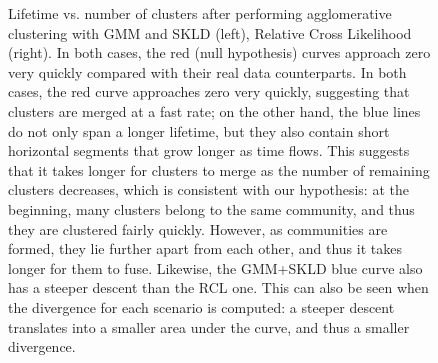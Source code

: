 \documentclass[pdftex,11pt,a4paper]{article}
\theoremstyle{definition}
\theoremstyle{remark}
\begin{document}
\begin{figure}[!t]
\caption{Lifetime vs. number of clusters after performing agglomerative clustering with GMM and SKLD (left), Relative Cross Likelihood (right). In both cases, the red (null hypothesis) curves approach zero very quickly compared with their real data counterparts. In both cases, the red curve approaches zero very quickly, suggesting that clusters are merged at a fast rate; on the other hand, the blue lines do not only span a longer lifetime, but they also contain short horizontal segments that grow longer as time flows. This suggests that it takes longer for clusters to merge as the number of remaining clusters decreases, which is consistent with our hypothesis: at the beginning, many clusters belong to the same community, and thus they are clustered fairly quickly. However, as communities are formed, they lie further apart from each other, and thus it takes longer for them to fuse. Likewise, the GMM+SKLD blue curve also has a steeper descent than the RCL one. This can also be seen when the divergence for each scenario is computed: a steeper descent translates into a smaller area under the curve, and thus a smaller divergence.
}
\label{fig_lifetime}
\end{figure}


\end{document}

